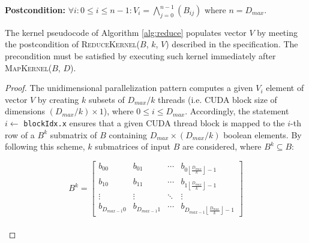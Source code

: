 \noindent \textbf{Postcondition:} $\forall i: 0 \leq i \leq n-1: V_i = \bigwedge_{j=0}^{n-1} (B_{ij})$ where $n = D_{max}$. \\

\begin{theorem}
The kernel pseudocode of Algorithm \ref{alg:reduce} populates vector $V$ by meeting the postcondition of 
\textsc{ReduceKernel($B$, $k$, $V$)} described in the specification. The precondition must be satisfied by 
executing such kernel immediately after \textsc{MapKernel($B$, $D$)}.
\end{theorem}

\begin{proof}
The unidimensional parallelization pattern computes a given $V_i$ element of vector $V$ by creating $k$ subsets of $D_{max} / k$ 
threads (i.e. CUDA block size of dimensions $(D_{max} / k) \times 1$), where $0 \leq i \leq D_{max}$. Accordingly, the 
statement $i \leftarrow $ \footnotesize\texttt{blockIdx.x} \normalsize ensures that a given CUDA thread block is mapped 
to the $i$-th row of a $B^{k}$ submatrix of $B$ containing $D_{max} \times (D_{max} / k)$ boolean elements. By following this scheme, 
$k$ submatrices of input $B$ are considered, where $B^{k} \subseteq B$:  

\[
B^{k} =
  \begin{bmatrix}
    b_{00} & b_{01} & \cdots & b_{0\left\lfloor\frac{D_{max}}{k}\right\rfloor-1} \\
    b_{10} & b_{11} & \cdots & b_{1\left\lfloor\frac{D_{max}}{k}\right\rfloor-1} \\
    \vdots & \vdots & \ddots & \vdots \\
    b_{D_{max-1}0} & b_{D_{max-1}1} & \cdots & b_{D_{max-1}\left\lfloor\frac{D_{max}}{k}\right\rfloor-1}
  \end{bmatrix} 
\] \\


\end{proof}
